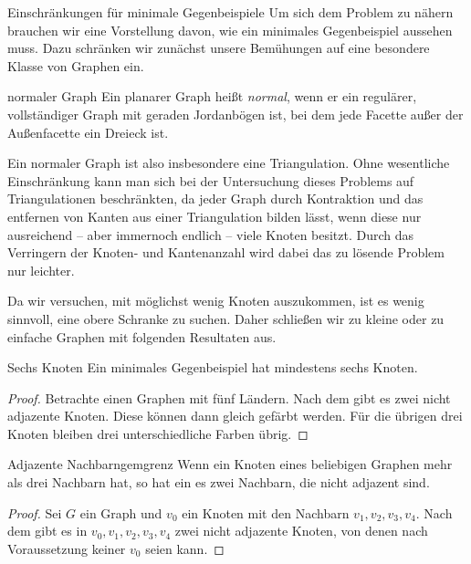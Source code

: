 \begin{section}{Einschränkungen für minimale Gegenbeispiele}
 Um sich dem Problem zu nähern brauchen wir eine Vorstellung davon, wie ein minimales Gegenbeispiel aussehen muss. Dazu schränken wir zunächst unsere Bemühungen auf eine  besondere Klasse von Graphen ein.
 
 \begin{definition}{normaler Graph}
  Ein planarer Graph heißt \textit{normal}, wenn er ein regulärer, vollständiger Graph mit geraden Jordanbögen ist, bei dem jede Facette außer der Außenfacette ein Dreieck ist.
 \end{definition}
 
 Ein normaler Graph ist also insbesondere eine Triangulation. Ohne wesentliche Einschränkung kann man sich bei der Untersuchung dieses Problems auf Triangulationen beschränkten, da jeder Graph durch Kontraktion und das entfernen von Kanten aus einer Triangulation bilden lässt, wenn diese nur ausreichend -- aber immernoch endlich -- viele Knoten besitzt. Durch das Verringern der Knoten- und Kantenanzahl wird dabei das zu lösende Problem nur leichter. 
 
 Da wir versuchen, mit möglichst wenig Knoten auszukommen, ist es wenig sinnvoll, eine obere Schranke zu suchen. Daher schließen wir zu kleine oder zu einfache Graphen mit folgenden Resultaten aus.
 
 \begin{proposition}{Sechs Knoten}
  Ein minimales Gegenbeispiel hat mindestens sechs Knoten.
 \end{proposition}
 \begin{proof}
  Betrachte einen Graphen mit fünf Ländern. Nach dem  gibt es zwei nicht adjazente Knoten. Diese können dann gleich gefärbt werden. Für die übrigen drei Knoten bleiben drei unterschiedliche Farben übrig.
 \end{proof}
 
 \begin{propositionl}{Adjazente Nachbarn}{gemgrenz}
  Wenn ein Knoten eines beliebigen Graphen mehr als drei Nachbarn hat, so hat ein es zwei Nachbarn, die nicht adjazent sind.
 \end{propositionl}
 \begin{proof}
  Sei $G$ ein Graph und $v_0$ ein Knoten mit den Nachbarn $v_1,v_2,v_3,v_4$. Nach dem  gibt es in $v_0,v_1,v_2,v_3,v_4$ zwei nicht adjazente Knoten, von denen nach Voraussetzung keiner $v_0$ seien kann.
 \end{proof}
 

\end{section}
